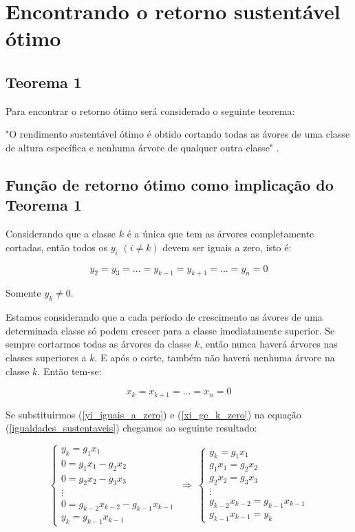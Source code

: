 \documentclass[a4paper, 12pt]{article}
\begin{document}
\section{Encontrando o retorno sustentável ótimo}
\subsection{Teorema 1}
 
Para encontrar o retorno ótimo será considerado o seguinte teorema:

"O rendimento sustentável ótimo é obtido cortando todas as ávores de uma classe de altura específica e nenhuma árvore de qualquer outra classe" \citep{teorema_escrito_anton}.

\subsection{Função de retorno ótimo como implicação do Teorema 1}

Considerando que a classe $k$ é a única que tem as árvores completamente cortadas, então todos os $y_i$ $(i \ne k)$ devem ser iguais a zero, isto é:

\begin{equation}\label{yi_iguais_a_zero}
    y_2=y_3=...=y_{k-1}=y_{k+1}=...=y_n=0
\end{equation}

Somente $y_k \ne 0$.

Estamos considerando que a cada período de crescimento as ávores de uma determinada classe só podem crescer para a classe imediatamente superior. Se sempre cortarmos todas as árvores da classe $k$, então nunca haverá árvores nas classes superiores a $k$. E após o corte, também não haverá nenhuma árvore na classe $k$. Então tem-se:

\begin{equation}\label{xi_ge_k_zero}
    x_k=x_{k+1}=...=x_n=0
\end{equation}

Se substituirmos (\ref{yi_iguais_a_zero}) e (\ref{xi_ge_k_zero}) na equação (\ref{igualdades_sustentaveis}) chegamos ao seguinte resultado:

$$\begin{cases}
y_k=g_1x_1\\
0=g_1x_1-g_2x_2\\
0=g_2x_2-g_3x_3\\
 \vdots \\
0=g_{k-2}x_{k-2}-g_{k-1}x_{k-1}\\
y_k=g_{k-1}x_{k-1}
\end{cases}\ \Longrightarrow \ \begin{cases}
y_k=g_1x_1\\
g_1x_1=g_2x_2\\
g_2x_2=g_3x_3\\
\vdots \\
g_{k-2}x_{k-2}=g_{k-1}x_{k-1}\\
g_{k-1}x_{k-1}=y_k
\end{cases}$$\newline
\end{document}

